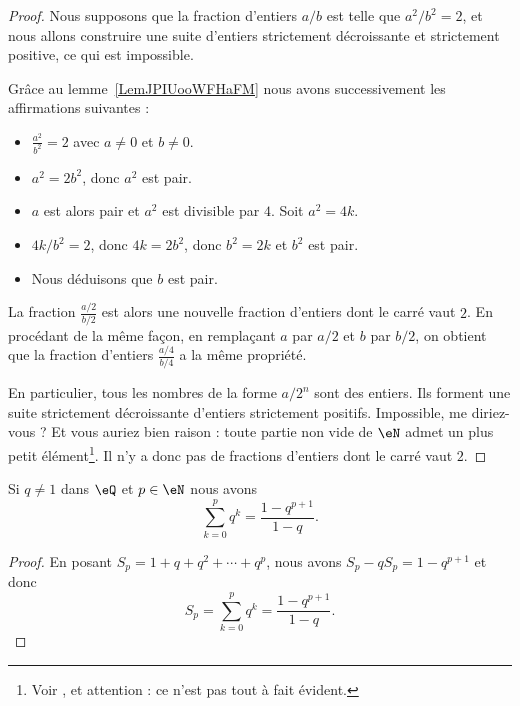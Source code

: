 \begin{proof}
    Nous supposons que la fraction d'entiers \( a/b\) est telle que \( a^2/b^2=2\), et nous allons construire une suite d'entiers strictement décroissante et strictement positive, ce qui est impossible.

    Grâce au lemme~\ref{LemJPIUooWFHaFM} nous avons successivement les affirmations suivantes :
    \begin{itemize}
        \item
        \(\frac{ a^2 }{ b^2 }=2 \)  avec \( a\neq 0\) et \( b\neq 0\).
    \item
        \( a^2=2b^2\), donc \( a^2\) est pair.
    \item
        \( a\) est alors pair et \( a^2\) est divisible par \( 4\). Soit \( a^2=4k\).
    \item
        \( 4k/b^2=2\), donc \( 4k=2b^2\), donc \( b^2=2k\) et \( b^2\) est pair.
    \item
        Nous déduisons que \( b\) est pair.
    \end{itemize}
    La fraction \( \frac{ a/2 }{ b/2 }\) est alors une nouvelle fraction d'entiers dont le carré vaut $2$. En procédant de la même façon, en remplaçant \( a\) par \( a/2\) et \( b\) par \( b/2\), on obtient que la fraction d'entiers \( \frac{ a/4 }{ b/4 }\) a la même propriété.

    En particulier, tous les nombres de la forme \( a/2^n\) sont des entiers.  Ils forment une suite strictement décroissante d'entiers strictement positifs. Impossible, me diriez-vous ? Et vous auriez bien raison : toute partie non vide de \( \eN\) admet un plus petit élément\footnote{Voir \cite{RWWJooJdjxEK}, et attention : ce n'est pas tout à fait évident.}. Il n'y a donc pas de fractions d'entiers dont le carré vaut \( 2\).
\end{proof}

\begin{lemma}   \label{LEMooOTVUooImvusn}
    Si \( q\neq 1\) dans \( \eQ\) et \( p\in \eN\) nous avons
    \begin{equation}
        \sum_{k=0}^pq^k=\frac{ 1-q^{p+1} }{ 1-q }.
    \end{equation}
\end{lemma}

\begin{proof}
    En posant \( S_p=1+q+q^2+\cdots +q^{p}\), nous avons $S_p-qS_p=1-q^{p+1}$ et donc
    \begin{equation}
        S_p=\sum_{k=0}^pq^k=\frac{ 1-q^{p+1} }{ 1-q }.
    \end{equation}
\end{proof}

